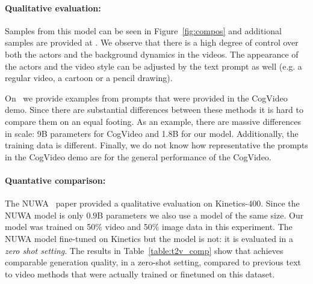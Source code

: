 \paragraph{Qualitative evaluation:} Samples from this model can be seen in Figure~\ref{fig:compos} and additional samples are provided at \website. We observe that there is a high degree of control over both the actors and the background dynamics in the videos. The appearance of the actors and the video style can be adjusted by the text prompt as well (e.g. a regular video, a cartoon or a pencil drawing). 

On \website\ we provide examples from prompts that were provided in the CogVideo~\cite{cogvideo} demo. Since there are substantial differences between these methods it is hard to compare them on an equal footing. As an example, there are massive differences in scale: 9B parameters for CogVideo and 1.8B for our model. Additionally, the training data is different. Finally, we do not know how representative the prompts in the CogVideo demo are for the general performance of the CogVideo. 

\paragraph{Quantative comparison:} 
The NUWA~\cite{nuwa} paper provided a qualitative evaluation on Kinetics-400. Since the NUWA model is only $0.9$B parameters we also use a model of the same size. Our model was trained on 50\% video and 50\% image data in this experiment. The NUWA model fine-tuned on Kinetics but the \phenaki model is not: it is evaluated in a \emph{zero shot setting}.  The results in Table~\ref{table:t2v_comp} show that \phenaki achieves comparable generation quality, in a zero-shot setting, compared to previous text to video methods that were actually trained or finetuned on this dataset. 

